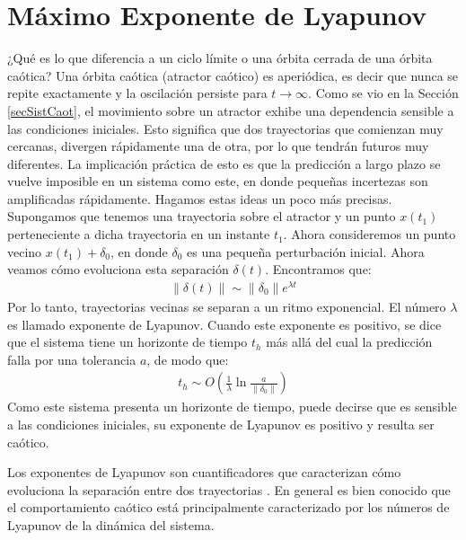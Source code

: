 \section{Máximo Exponente de Lyapunov}
\label{secMLE}

¿Qué es lo que diferencia a un ciclo límite o una órbita cerrada de una órbita caótica?
Una órbita caótica (atractor caótico) es aperiódica, es decir que nunca se repite exactamente y la oscilación persiste para $t \to \infty$.
Como se vio en la Sección \ref{secSistCaot}, el movimiento sobre un atractor exhibe una dependencia sensible a las condiciones iniciales.
Esto significa que dos trayectorias que comienzan muy cercanas, divergen rápidamente una de otra, por lo que tendrán futuros muy diferentes.
La implicación práctica de esto es que la predicción a largo plazo se vuelve imposible en un sistema como este, en donde pequeñas incertezas son amplificadas rápidamente.
Hagamos estas ideas un poco más precisas.
Supongamos que tenemos una trayectoria sobre el atractor y un punto $x(t_1)$ perteneciente a dicha trayectoria en un instante $t_1$.
Ahora consideremos un punto vecino $x(t_1) + \delta_0$, en donde $\delta_0$ es una pequeña perturbación inicial.
Ahora veamos cómo evoluciona esta separación $\delta(t)$.
Encontramos que:
%
\begin{eqnarray}
\lVert \delta(t) \rVert \sim \lVert \delta_0 \rVert e^{\lambda t}
\end{eqnarray}
%
Por lo tanto, trayectorias vecinas se separan a un ritmo exponencial.
El número $\lambda$ es llamado exponente de Lyapunov.
Cuando este exponente es positivo, se dice que el sistema tiene un horizonte de tiempo $t_h$ más allá del cual la predicción falla por una tolerancia $a$, de modo que:
%
\begin{eqnarray}
t_h \sim O ( \frac{1}{\lambda} \ln \frac{a}{\lVert \delta_0 \rVert})
\end{eqnarray}
%
Como este sistema presenta un horizonte de tiempo, puede decirse que es sensible a las condiciones iniciales, su exponente de Lyapunov es positivo y resulta ser caótico.

Los exponentes de Lyapunov son cuantificadores que caracterizan cómo evoluciona la separación entre dos trayectorias \cite{Sprott2003}.
En general es bien conocido que el comportamiento caótico está principalmente caracterizado por los números de Lyapunov de la dinámica del sistema.

